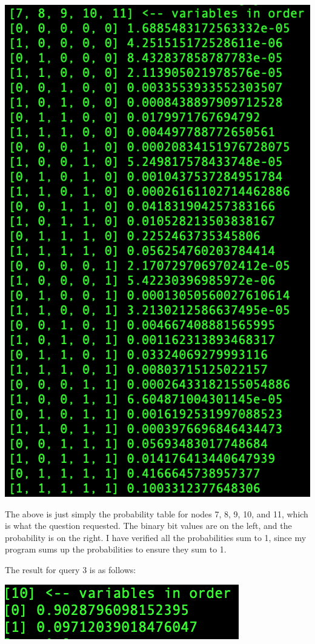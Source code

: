 \documentclass[12pt]{article}
\begin{document}
\includegraphics[scale=0.7]{query2}

The above is just simply the probability table for nodes 7, 8, 9, 10, and 11, which is what the question requested. The binary bit values are on the left, and the probability is on the right. I have verified all the probabilities sum to 1, since my program sums up the probabilities to ensure they sum to 1.

The result for query 3 is as follows:

\includegraphics[scale=0.8]{query3}
\end{document}
